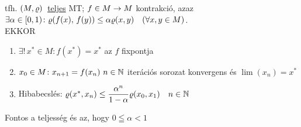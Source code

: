 \begin{te}
  tfh. $(M,\varrho)\,$ \underline{teljes} MT; $f\in M\to M$ kontrakció, azaz
  $\exists \alpha \in [0,1)\colon \varrho( f(x),\, f(y)) \leq \alpha
    \varrho(x,y) \quad (\forall x,y\in M)$.\\
    EKKOR \begin{enumerate}
    \item$\exists!\, x^*\in M\colon f(x^*) = x^*$ az $f$ fixpontja
    \item $x_0\in M\colon x_{n+1} = f(x_n)\ n\in \mathbb{N}$ iterációs
      sorozat konvergens és $\lim(x_n) = x^*$
    \item Hibabecslés: $\varrho(x^*,x_n) \leq
      \dfrac{\alpha^n}{1-\alpha}\varrho(x_0,x_1)\quad n\in \mathbb{N}$
    \end{enumerate}
\end{te}
\begin{megj}
  Fontos a teljesség és az, hogy $0\leqq \alpha < 1$
\end{megj}
